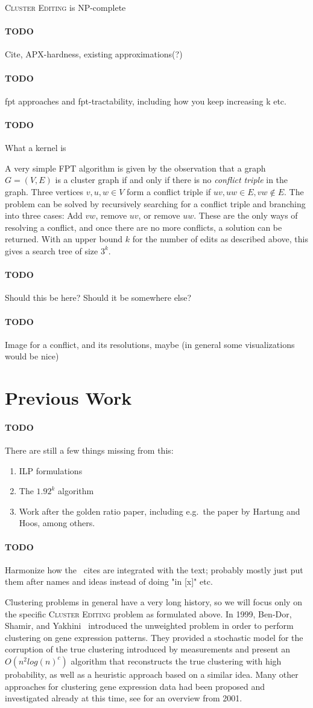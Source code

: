 \documentclass{article}
\newcommand{\todo}[1]{\paragraph{TODO} #1}
\theoremstyle{definition}
\begin{document}
\textsc{Cluster Editing} is NP-complete
\todo Cite, APX-hardness, existing approximations(?)

\todo fpt approaches and fpt-tractability, including how you keep increasing k etc.
\todo What a kernel is

A very simple FPT algorithm is given by the observation that a graph $G = (V, E)$ is a cluster graph
if and only if there is no \emph{conflict triple} in the graph. Three vertices $v, u, w \in V$ form
a conflict triple if $uv, uw \in E, vw \notin E$. The problem can be solved by recursively searching
for a conflict triple and branching into three cases: Add $vw$, remove $uv$, or remove $uw$. These
are the only ways of resolving a conflict, and once there are no more conflicts, a solution can be
returned. With an upper bound $k$ for the number of edits as described above, this gives a search
tree of size $3^k$.

\todo Should this be here? Should it be somewhere else?

\todo Image for a conflict, and its resolutions, maybe (in general some visualizations would be
nice)


\section{Previous Work}

\todo There are still a few things missing from this: \begin{enumerate}
	\item ILP formulations
	\item The $1.92^k$ algorithm
	\item Work after the golden ratio paper, including e.g.\ the paper by Hartung and Hoos, among
		others.
\end{enumerate}

\todo Harmonize how the \ cites are integrated with the text; probably mostly just put them after
names and ideas instead of doing "in [x]" etc.

Clustering problems in general have a very long history, so we will focus only on the specific
\textsc{Cluster Editing} problem as formulated above. In 1999, Ben-Dor, Shamir, and
Yakhini~\cite{BenDor} introduced the unweighted problem in order to perform clustering on gene
expression patterns. They provided a stochastic model for the corruption of the true clustering
introduced by measurements and present an $O(n^2 log(n)^c)$ algorithm that reconstructs the true
clustering with high probability, as well as a heuristic approach based on a similar idea. Many
other approaches for clustering gene expression data had been proposed and investigated already at
this time, see \cite{ShamirOverview} for an overview from 2001.
\end{document}
